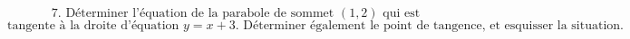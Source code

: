 \documentclass{article}
\begin{document}
\[ \text{7. Déterminer l'équation de la parabole de sommet } (1,2) \text{ qui est} \]
\[ \text{tangente à la droite d'équation } y = x + 3. \text{ Déterminer également le point de tangence, et esquisser la situation.} \]
\end{document}
